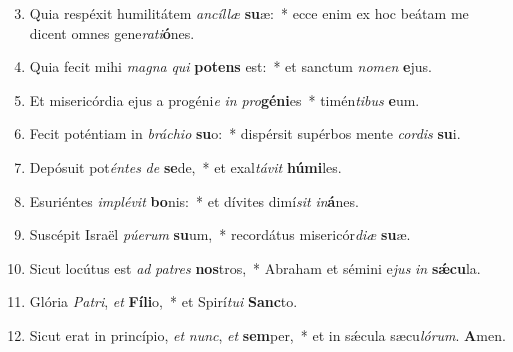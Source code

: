 \begin{enumerate}
\setcounter{enumi}{2}

\item Quia respéxit humilitátem \textit{an}\textit{cíl}\textit{læ} \textbf{su}æ:~* ecce enim ex hoc beátam me dicent omnes gene\textit{ra}\textit{ti}\textbf{ó}nes.

\item Quia fecit mihi \textit{ma}\textit{gna} \textit{qui} \textbf{pot}\textbf{ens} est:~* et sanctum \textit{no}\textit{men} \textbf{e}jus.

\item Et misericórdia ejus a progéni\textit{e} \textit{in} \textit{pro}\textbf{gé}\textbf{ni}es~* timén\textit{ti}\textit{bus} \textbf{e}um.

\item Fecit poténtiam in \textit{brá}\textit{chi}\textit{o} \textbf{su}o:~* dispérsit supérbos mente \textit{cor}\textit{dis} \textbf{su}i.

\item Depósuit pot\textit{én}\textit{tes} \textit{de} \textbf{se}de,~* et exal\textit{tá}\textit{vit} \textbf{hú}\textbf{mi}les.

\item Esuriéntes \textit{im}\textit{plé}\textit{vit} \textbf{bo}nis:~* et dívites dimí\textit{sit} \textit{in}\textbf{á}nes.

\item Suscépit Israël \textit{pú}\textit{e}\textit{rum} \textbf{su}um,~* recordátus misericór\textit{di}\textit{æ} \textbf{su}æ.

\item Sicut locútus est \textit{ad} \textit{pa}\textit{tres} \textbf{nos}tros,~* Abraham et sémini e\textit{jus} \textit{in} \textbf{sǽ}\textbf{cu}la.

\item Glória \textit{Pa}\textit{tri}, \textit{et} \textbf{Fí}\textbf{li}o,~* et Spirí\textit{tu}\textit{i} \textbf{Sanc}to.

\item Sicut erat in princípio, \textit{et} \textit{nunc}, \textit{et} \textbf{sem}per,~* et in sǽcula sæcu\textit{ló}\textit{rum}. \textbf{A}men.

\end{enumerate}

